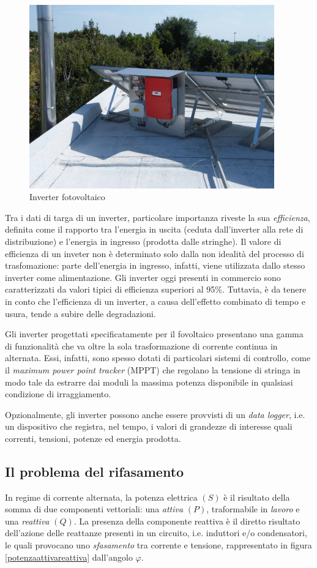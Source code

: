 %
%
\begin{figure}[!h]
\centering
\includegraphics[width=300pt]{img/pv-inverter.jpg}
\caption{Inverter fotovoltaico}
\end{figure}
%
Tra i dati di targa di un inverter, particolare importanza riveste la sua 
\emph{efficienza}, definita come il rapporto tra l'energia in uscita 
(ceduta dall'inverter alla rete di distribuzione) e l'energia in ingresso 
(prodotta dalle stringhe).
%
Il valore di efficienza di un inveter non \`e determinato solo dalla 
non idealit\`a del processo di trasfomazione: parte dell'energia in ingresso, 
infatti, viene utilizzata dallo stesso inverter come alimentazione.
%
Gli inverter oggi presenti in commercio sono caratterizzati da valori tipici di
efficienza superiori al 95\%. Tuttavia, \`e da tenere in conto che l'efficienza 
di un inverter, a causa dell'effetto combinato di tempo e usura, tende a 
subire delle degradazioni.
%

%
Gli inverter progettati specificatamente per il fovoltaico presentano una gamma 
di funzionalit\`a che va oltre la sola trasformazione di corrente continua 
in alternata. Essi, infatti, sono spesso dotati di particolari sistemi di 
controllo, come il \emph{maximum power point tracker} (MPPT) che regolano la tensione 
di stringa in modo tale da estrarre dai moduli la massima potenza disponibile 
in qualsiasi condizione di irraggiamento.
%

%
Opzionalmente, gli inverter possono anche essere provvisti di un \emph{data logger}, 
i.e. un dispositivo che registra, nel tempo, i valori di grandezze di interesse quali 
correnti, tensioni, potenze ed energia prodotta.

%
\subsection{Il problema del rifasamento}
%
In regime di corrente alternata, la potenza elettrica $(S)$ \`e il risultato della 
somma di due componenti vettoriali: una \emph{attiva} $(P)$, traformabile in 
\emph{lavoro} e una \emph{reattiva} $(Q)$.
%
La presenza della componente reattiva \`e il diretto risultato dell'azione delle 
reattanze presenti in un circuito, i.e. induttori e/o condensatori, le quali 
provocano uno \emph{sfasamento} tra corrente e tensione, rappresentato in 
figura \ref{potenzaattivareattiva} dall'angolo $\varphi$.
%

